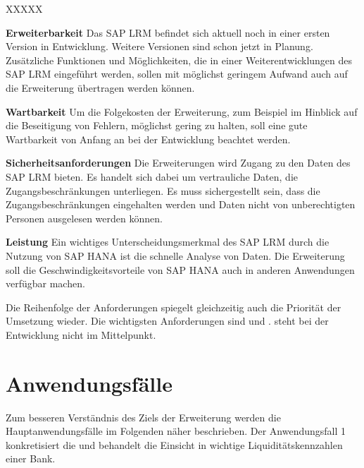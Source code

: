 \begin{onehalfspacing}
\begin{seToplist}{ XXXXX }
\item[\anfl{erweiterbarkeit}] \textbf{Erweiterbarkeit} \newline
Das SAP LRM befindet sich aktuell noch in einer ersten Version in Entwicklung. Weitere Versionen sind schon jetzt in Planung. Zusätzliche Funktionen und Möglichkeiten, die in einer Weiterentwicklungen des SAP LRM eingeführt werden, sollen mit möglichst geringem Aufwand auch auf die Erweiterung übertragen werden können.

\item[\anfl{wartbarkeit}] \textbf{Wartbarkeit} \newline
Um die Folgekosten der Erweiterung, zum Beispiel im Hinblick auf die Beseitigung von Fehlern, möglichst gering zu halten, soll eine gute Wartbarkeit von Anfang an bei der Entwicklung beachtet werden.

\item[\anfl{sicherheit}] \textbf{Sicherheitsanforderungen} \newline
Die Erweiterungen wird Zugang zu den Daten des SAP LRM bieten. Es handelt sich dabei um vertrauliche Daten, die  Zugangsbeschränkungen unterliegen. Es muss sichergestellt sein, dass die Zugangsbeschränkungen eingehalten werden und Daten nicht von unberechtigten Personen ausgelesen werden können.

\item[\anfl{leistung}] \textbf{Leistung} \newline
Ein wichtiges Unterscheidungsmerkmal des SAP LRM durch die Nutzung von SAP HANA ist die schnelle Analyse von Daten. Die Erweiterung soll die Geschwindigkeitsvorteile von SAP HANA auch in anderen Anwendungen verfügbar machen.

\end{seToplist}

Die Reihenfolge der Anforderungen spiegelt gleichzeitig auch die Priorität der Umsetzung wieder. Die wichtigsten Anforderungen sind  und .  steht bei der Entwicklung nicht im Mittelpunkt.

\section{Anwendungsfälle}
Zum besseren Verständnis des Ziels der Erweiterung werden die Hauptanwendungsfälle im Folgenden näher beschrieben. Der Anwendungsfall 1 konkretisiert die  und behandelt die Einsicht in wichtige Liquiditätskennzahlen einer Bank.


\end{onehalfspacing}
